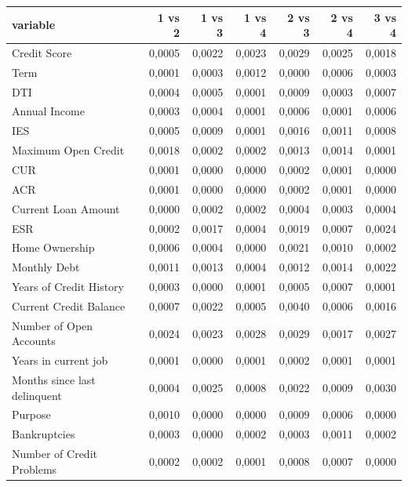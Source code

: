\begin{tabular}{lrrrrrr}
\toprule
\textbf{variable} & \textbf{1 vs 2} & \textbf{1 vs 3} & \textbf{1 vs 4} & \textbf{2 vs 3} & \textbf{2 vs 4} & \textbf{3 vs 4} \\
\midrule
Credit Score & 0,0005 & 0,0022 & 0,0023 & 0,0029 & 0,0025 & 0,0018 \\
Term & 0,0001 & 0,0003 & 0,0012 & 0,0000 & 0,0006 & 0,0003 \\
DTI & 0,0004 & 0,0005 & 0,0001 & 0,0009 & 0,0003 & 0,0007 \\
Annual Income & 0,0003 & 0,0004 & 0,0001 & 0,0006 & 0,0001 & 0,0006 \\
IES & 0,0005 & 0,0009 & 0,0001 & 0,0016 & 0,0011 & 0,0008 \\
Maximum Open Credit & 0,0018 & 0,0002 & 0,0002 & 0,0013 & 0,0014 & 0,0001 \\
CUR & 0,0001 & 0,0000 & 0,0000 & 0,0002 & 0,0001 & 0,0000 \\
ACR & 0,0001 & 0,0000 & 0,0000 & 0,0002 & 0,0001 & 0,0000 \\
Current Loan Amount & 0,0000 & 0,0002 & 0,0002 & 0,0004 & 0,0003 & 0,0004 \\
ESR & 0,0002 & 0,0017 & 0,0004 & 0,0019 & 0,0007 & 0,0024 \\
Home Ownership & 0,0006 & 0,0004 & 0,0000 & 0,0021 & 0,0010 & 0,0002 \\
Monthly Debt & 0,0011 & 0,0013 & 0,0004 & 0,0012 & 0,0014 & 0,0022 \\
Years of Credit History & 0,0003 & 0,0000 & 0,0001 & 0,0005 & 0,0007 & 0,0001 \\
Current Credit Balance & 0,0007 & 0,0022 & 0,0005 & 0,0040 & 0,0006 & 0,0016 \\
Number of Open Accounts & 0,0024 & 0,0023 & 0,0028 & 0,0029 & 0,0017 & 0,0027 \\
Years in current job & 0,0001 & 0,0000 & 0,0001 & 0,0002 & 0,0001 & 0,0001 \\
Months since last delinquent & 0,0004 & 0,0025 & 0,0008 & 0,0022 & 0,0009 & 0,0030 \\
Purpose & 0,0010 & 0,0000 & 0,0000 & 0,0009 & 0,0006 & 0,0000 \\
Bankruptcies & 0,0003 & 0,0000 & 0,0002 & 0,0003 & 0,0011 & 0,0002 \\
Number of Credit Problems & 0,0002 & 0,0002 & 0,0001 & 0,0008 & 0,0007 & 0,0000 \\
\bottomrule
\end{tabular}
